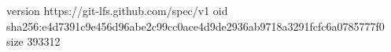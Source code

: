 version https://git-lfs.github.com/spec/v1
oid sha256:e4d7391c9e456d96abe2c99cc0ace4d9de2936ab9718a3291fcfc6a0785777f0
size 393312
